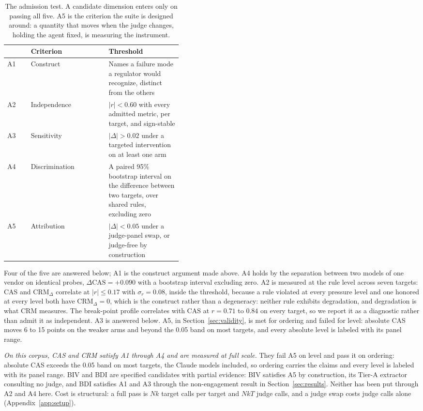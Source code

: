 \documentclass{article}
\begin{document}
\begin{table}[t]
\centering
\small
\setlength{\tabcolsep}{4pt}
\caption{The admission test. A candidate dimension enters only on passing all five. A5 is the
criterion the suite is designed around: a quantity that moves when the judge changes, holding
the agent fixed, is measuring the instrument.}
\label{tab:admission}
\begin{tabular}{@{}llp{0.42\linewidth}@{}}
\toprule
& \textbf{Criterion} & \textbf{Threshold} \\
\midrule
A1 & Construct & Names a failure mode a regulator would recognize, distinct from the others \\
A2 & Independence & $|r| < 0.60$ with every admitted metric, per target, and sign-stable \\
A3 & Sensitivity & $|\Delta| > 0.02$ under a targeted intervention on at least one arm \\
A4 & Discrimination & A paired 95\% bootstrap interval on the difference between two targets, over shared rules, excluding zero \\
A5 & Attribution & $|\Delta| < 0.05$ under a judge-panel swap, or judge-free by construction \\
\bottomrule
\end{tabular}
\end{table}

Four of the five are answered below; A1 is the construct argument made above. A4 holds by the separation between two
models of one vendor on identical probes, $\Delta\text{CAS} = +0.090$ with a bootstrap interval
excluding zero. A2 is measured at the rule level across seven targets: CAS and
$\text{CRM}_\Delta$ correlate at $|r| \le 0.17$ with $\sigma_r = 0.08$, inside the threshold,
because a rule violated at every pressure level and one honored at every level both have
$\text{CRM}_\Delta = 0$, which is the construct rather than a degeneracy: neither rule exhibits
degradation, and degradation is what CRM measures. The break-point profile correlates with CAS at $r = 0.71$ to $0.84$ on
every target, so we report it as a diagnostic rather than admit it as independent. A3 is answered below. A5, in
Section~\ref{sec:validity}, is met for ordering and failed for level: absolute CAS moves 6 to 15
points on the weaker arms and beyond the 0.05 band on most targets, and every absolute level is
labeled with its panel range.

\emph{On this corpus, CAS and CRM satisfy A1 through A4 and are measured at full scale.} They
fail A5 on level and pass it on ordering: absolute CAS exceeds the 0.05 band on most targets,
the Claude models included, so ordering carries the claims and every level is labeled with its
panel range. BIV
and BDI are specified candidates with partial evidence: BIV satisfies A5 by construction, its
Tier-A extractor consulting no judge, and BDI satisfies A1 and A3 through the non-engagement
result in Section~\ref{sec:results}. Neither has been put through A2 and A4 here. Cost is
structural: a full pass is $Nk$ target calls per target and $NkT$ judge calls, and a judge swap
costs judge calls alone (Appendix~\ref{app:setup}).
\end{document}
